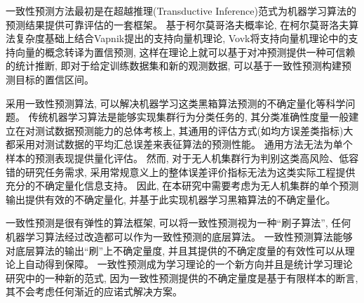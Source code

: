 一致性预测方法最初是在超越推理(Transductive Inference)范式\citep{vovk2021-priviate-communication}为机器学习算法的预测结果提供可靠评估的一套框架\citep{gammerman1998,soton1999,Saunders1999}。 基于柯尔莫哥洛夫概率论\citep{Kolmogorov1933,Kolmogorov-en-1956}, 在柯尔莫哥洛夫算法复杂度基础上\citep{Kolmogorov-en-1931-analytical,Kolmogorov-en-1946-leastsquare,Kolmogorov-en-1983,Kolmogorov-en-1991,Heidegger1966}结合Vapnik提出的支持向量机理论\citep{Cortes1995,vapnik1998}, Vovk将支持向量机理论中的支持向量的概念转译为置信预测, 这样在理论上就可以基于对冲预测提供一种可信赖的统计推断\citep{vovk2005algorithmic,2006Hedging}, 即对于给定训练数据集和新的观测数据, 可以基于一致性预测构建预测目标的置信区间。

采用一致性预测算法, 可以解决机器学习这类黑箱算法预测的不确定量化等科学问题。 传统机器学习算法是能够实现集群行为分类任务的, 其分类准确性度量一般建立在对测试数据预测能力的总体考核上, 其通用的评估方式(如均方误差类指标)大都采用对测试数据的平均汇总误差来表征算法的预测性能。 通用方法无法为单个样本的预测表现提供量化评估。 然而, 对于无人机集群行为判别这类高风险、低容错的研究任务需求, 采用常规意义上的整体误差评价指标无法为这类实际工程提供充分的不确定量化信息支持。 因此, 在本研究中需要考虑为无人机集群的单个预测输出提供有效的不确定量化, 并基于此实现机器学习黑箱算法的不确定量化。 

一致性预测是很有弹性的算法框架, 可以将一致性预测视为一种“刷子算法”, 任何机器学习算法经过改造都可以作为一致性预测的底层算法。 一致性预测算法能够对底层算法的输出“刷”上不确定量度, 并且其提供的不确定度量的有效性可以从理论上自动得到保障。 一致性预测成为学习理论的一个新方向并且是统计学习理论研究中的一种新的范式\citep{2006Hedging}, 因为一致性预测提供的不确定量度是基于有限样本的断言, 其不会考虑任何渐近的应诺式解决方案\citep{vovk2005algorithmic,2006Hedging}。

%

